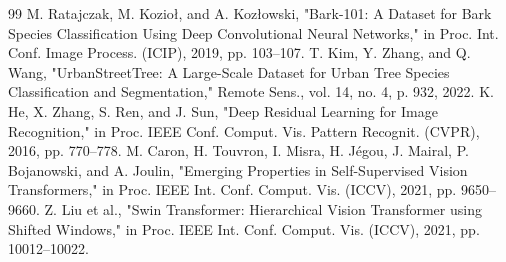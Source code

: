 \documentclass{article}
\begin{document}
\begin{thebibliography}{99}
 M. Ratajczak, M. Kozioł, and A. Kozłowski, "Bark-101: A Dataset for Bark Species Classification Using Deep Convolutional Neural Networks," in Proc. Int. Conf. Image Process. (ICIP), 2019, pp. 103–107.
 T. Kim, Y. Zhang, and Q. Wang, "UrbanStreetTree: A Large-Scale Dataset for Urban Tree Species Classification and Segmentation," Remote Sens., vol. 14, no. 4, p. 932, 2022.
 K. He, X. Zhang, S. Ren, and J. Sun, "Deep Residual Learning for Image Recognition," in Proc. IEEE Conf. Comput. Vis. Pattern Recognit. (CVPR), 2016, pp. 770–778.
 M. Caron, H. Touvron, I. Misra, H. Jégou, J. Mairal, P. Bojanowski, and A. Joulin, "Emerging Properties in Self-Supervised Vision Transformers," in Proc. IEEE Int. Conf. Comput. Vis. (ICCV), 2021, pp. 9650–9660.
 Z. Liu et al., "Swin Transformer: Hierarchical Vision Transformer using Shifted Windows," in Proc. IEEE Int. Conf. Comput. Vis. (ICCV), 2021, pp. 10012–10022.
\end{thebibliography}
\end{document}
